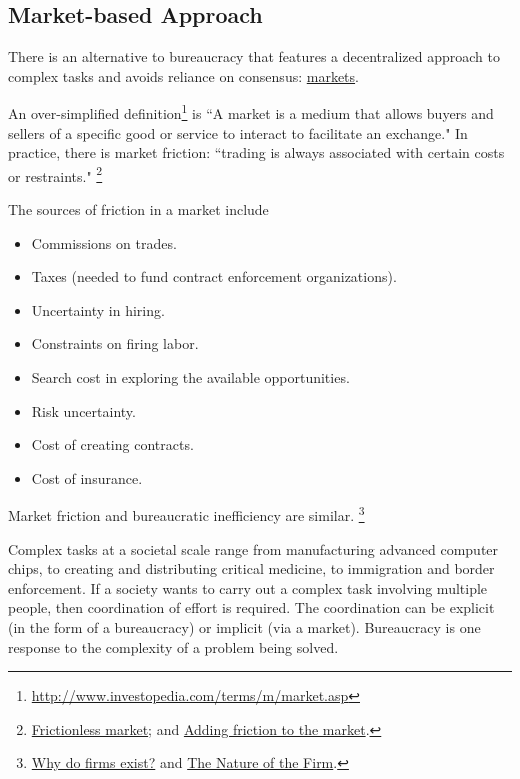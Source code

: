 \subsection*{Market-based Approach}

There is an alternative to bureaucracy that features a decentralized approach to complex tasks and avoids reliance on consensus: \href{https://en.wikipedia.org/wiki/Market_(economics)}{markets}.

An over-simplified definition\footnote{\href{http://www.investopedia.com/terms/m/market.asp}{http://www.investopedia.com/terms/m/market.asp}} is ``A market is a medium that allows buyers and sellers of a specific good or service to interact to facilitate an exchange." 
In practice, there is market friction: ``trading is always associated with certain costs or restraints."
\footnote{\href{http://www.investopedia.com/terms/f/frictionlessmarket.asp}{Frictionless market};
and \href{https://insight.kellogg.northwestern.edu/article/adding_friction_to_the_market}{Adding friction to the market}.}

The sources of friction in a market include
\begin{itemize}
    \item Commissions on trades.
    \item Taxes (needed to fund contract enforcement organizations).
    \item Uncertainty in hiring.
    \item Constraints on firing labor.
    \item Search cost in exploring the available opportunities.
    \item Risk uncertainty.
    \item Cost of creating contracts.
    \item Cost of insurance.
\end{itemize}
Market friction and bureaucratic inefficiency are similar. \footnote{  \href{http://www.economist.com/node/17730360}{Why do firms exist?} and \href{https://en.wikipedia.org/wiki/The_Nature_of_the_Firm}{The Nature of the Firm}.
}

Complex tasks at a societal scale range from manufacturing advanced computer chips, to creating and distributing critical medicine, to immigration and border enforcement. 
If a society wants to carry out a complex task involving multiple people, then coordination of effort is required. The coordination can be explicit (in the form of a bureaucracy) or implicit (via a market).  Bureaucracy is one response to the complexity of a problem being solved.


